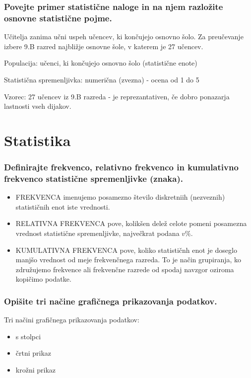 \documentclass{article}
\begin{document}
\subsubsection*{Povejte primer statistične naloge in na njem razložite osnovne statistične pojme.}

Učitelja zanima učni uspeh učencev, ki končujejo osnovno šolo. Za preučevanje izbere 9.B razred najbližje osnovne šole, v katerem je 27 učencev.

Populacija: učenci, ki končujejo osnovno šolo (statistične enote)

Statistična spremenljivka: numerična (zvezna) - ocena od 1 do 5

Vzorec: 27 učencev iz 9.B razreda - je reprezantativen, če dobro ponazarja lastnosti vseh dijakov.

\section{Statistika}
\subsubsection*{Definirajte frekvenco, relativno frekvenco in kumulativno frekvenco statistične spremenljivke (znaka).}

\begin{itemize}
  \item FREKVENCA imenujemo posamezno število diskretniih (nezveznih) statističnih enot iste vrednosti.


\item RELATIVNA FREKVENCA pove, kolikšen delež celote pomeni posamezna vrednost statistične spremenljivke, največkrat podana $v \%$.

\item KUMULATIVNA FREKVENCA pove, koliko statističnh enot je doseglo manjšo vrednost od meje frekvenčnega razreda. To je način grupiranja, ko združujemo frekvence ali frekvenčne razrede od spodaj navzgor oziroma kopičimo podatke.

\end{itemize}

\subsubsection*{Opišite tri načine grafičnega prikazovanja podatkov.}

Tri načini grafičnega prikazovanja podatkov:
\begin{itemize}
    \item s stolpci
    \item črtni prikaz
    \item krožni prikaz
\end{itemize}
\end{document}
